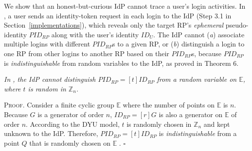 \newc
We show that an honest-but-curious IdP cannot trace a user's login activities. In \usso, a user sends an identity-token request in each login to the IdP (Step 3.1 in Section~\ref{implementations}), which reveals only the target RP's \emph{ephemeral} pseudo-identity $PID_{RP}$ along with the user's identity $ID_U$.
The IdP cannot (\emph{a}) associate multiple logins with different $PID_{RP}$s to a given RP,
 or (\emph{b}) distinguish a login to one RP from other logins to another RP based on their $PID_{RP}$s,
 because $PID_{RP}$ is \emph{indistinguishable} from random variables to the IdP, as proved in Theorem 6.

\vspace{3mm}
 {\em In \usso, the IdP cannot distinguish $PID_{RP} = [t]ID_{RP}$ from a random variable on $\mathbb{E}$, where $t$ is random in $\mathbb{Z}_n$.} %

\vspace{0.75mm}
\noindent \textsc{Proof.}
Consider a finite cyclic group $\mathbb{E}$ where the number of points on $\mathbb{E}$ is $n$.
Because $G$ is a generator of order $n$, $ID_{RP} = [r]G$ is also a generator on $\mathbb{E}$ of order $n$. According to the DYU model, $t$ is randomly chosen in $\mathbb{Z}_n$ and kept unknown to the IdP. Therefore, $PID_{RP} = [t]ID_{RP}$ is \emph{indistinguishable} from a point $Q$ that is randomly chosen on $\mathbb{E}$ \cite{oprf-proved,strong-oprf}. \hfill $\square$





